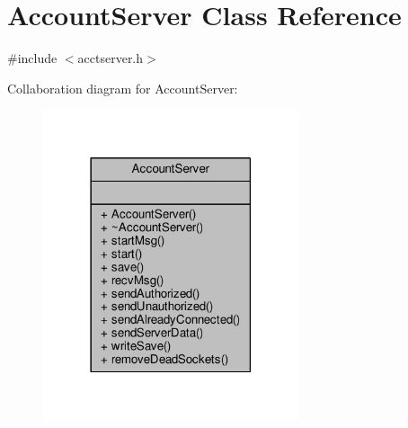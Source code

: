 \hypertarget{classAccountServer}{}\section{Account\+Server Class Reference}
\label{classAccountServer}


{\ttfamily \#include $<$acctserver.\+h$>$}



Collaboration diagram for Account\+Server\+:
\nopagebreak
\begin{figure}[H]
\begin{center}
\leavevmode
\includegraphics[width=213pt]{d8/d4a/classAccountServer__coll__graph}
\end{center}
\end{figure}

